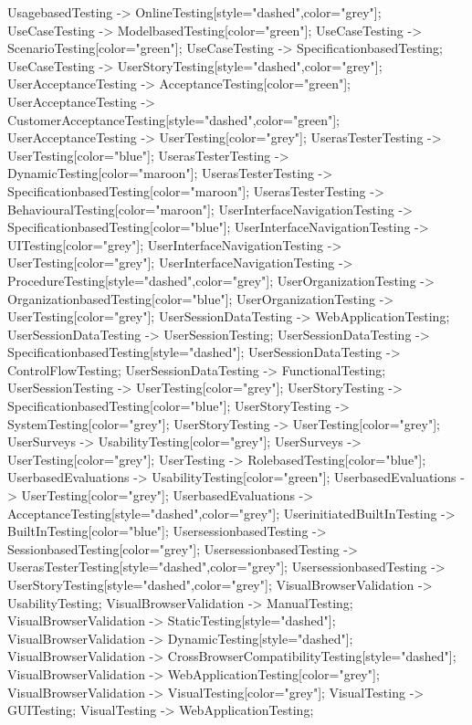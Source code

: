 \documentclass{article}
\begin{document}
{UsagebasedTesting -> OnlineTesting[style="dashed",color="grey"];
UseCaseTesting -> ModelbasedTesting[color="green"];
UseCaseTesting -> ScenarioTesting[color="green"];
UseCaseTesting -> SpecificationbasedTesting;
UseCaseTesting -> UserStoryTesting[style="dashed",color="grey"];
UserAcceptanceTesting -> AcceptanceTesting[color="green"];
UserAcceptanceTesting -> CustomerAcceptanceTesting[style="dashed",color="green"];
UserAcceptanceTesting -> UserTesting[color="grey"];
UserasTesterTesting -> UserTesting[color="blue"];
UserasTesterTesting -> DynamicTesting[color="maroon"];
UserasTesterTesting -> SpecificationbasedTesting[color="maroon"];
UserasTesterTesting -> BehaviouralTesting[color="maroon"];
UserInterfaceNavigationTesting -> SpecificationbasedTesting[color="blue"];
UserInterfaceNavigationTesting -> UITesting[color="grey"];
UserInterfaceNavigationTesting -> UserTesting[color="grey"];
UserInterfaceNavigationTesting -> ProcedureTesting[style="dashed",color="grey"];
UserOrganizationTesting -> OrganizationbasedTesting[color="blue"];
UserOrganizationTesting -> UserTesting[color="grey"];
UserSessionDataTesting -> WebApplicationTesting;
UserSessionDataTesting -> UserSessionTesting;
UserSessionDataTesting -> SpecificationbasedTesting[style="dashed"];
UserSessionDataTesting -> ControlFlowTesting;
UserSessionDataTesting -> FunctionalTesting;
UserSessionTesting -> UserTesting[color="grey"];
UserStoryTesting -> SpecificationbasedTesting[color="blue"];
UserStoryTesting -> SystemTesting[color="grey"];
UserStoryTesting -> UserTesting[color="grey"];
UserSurveys -> UsabilityTesting[color="grey"];
UserSurveys -> UserTesting[color="grey"];
UserTesting -> RolebasedTesting[color="blue"];
UserbasedEvaluations -> UsabilityTesting[color="green"];
UserbasedEvaluations -> UserTesting[color="grey"];
UserbasedEvaluations -> AcceptanceTesting[style="dashed",color="grey"];
UserinitiatedBuiltInTesting -> BuiltInTesting[color="blue"];
UsersessionbasedTesting -> SessionbasedTesting[color="grey"];
UsersessionbasedTesting -> UserasTesterTesting[style="dashed",color="grey"];
UsersessionbasedTesting -> UserStoryTesting[style="dashed",color="grey"];
VisualBrowserValidation -> UsabilityTesting;
VisualBrowserValidation -> ManualTesting;
VisualBrowserValidation -> StaticTesting[style="dashed"];
VisualBrowserValidation -> DynamicTesting[style="dashed"];
VisualBrowserValidation -> CrossBrowserCompatibilityTesting[style="dashed"];
VisualBrowserValidation -> WebApplicationTesting[color="grey"];
VisualBrowserValidation -> VisualTesting[color="grey"];
VisualTesting -> GUITesting;
VisualTesting -> WebApplicationTesting;
}
\end{document}
